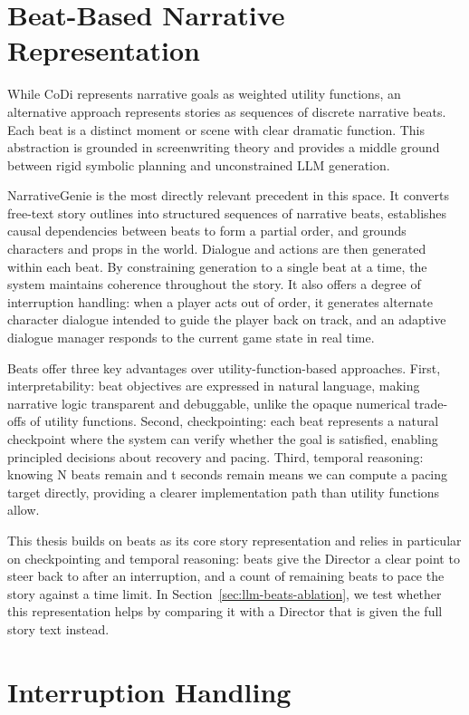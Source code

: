 \section{Beat-Based Narrative Representation}

While CoDi represents narrative goals as weighted utility functions, an alternative approach represents stories as sequences of discrete narrative beats. Each beat is a distinct moment or scene with clear dramatic function. This abstraction is grounded in screenwriting theory \cite{mckee1997story} and provides a middle ground between rigid symbolic planning and unconstrained LLM generation.

NarrativeGenie \cite{kumaran2024narrativegenie} is the most directly relevant precedent in this space. It converts free-text story outlines into structured sequences of narrative beats, establishes causal dependencies between beats to form a partial order, and grounds characters and props in the world. Dialogue and actions are then generated within each beat. By constraining generation to a single beat at a time, the system maintains coherence throughout the story. It also offers a degree of interruption handling: when a player acts out of order, it generates alternate character dialogue intended to guide the player back on track, and an adaptive dialogue manager responds to the current game state in real time.

Beats offer three key advantages over utility-function-based approaches. First, interpretability: beat objectives are expressed in natural language, making narrative logic transparent and debuggable, unlike the opaque numerical trade-offs of utility functions. Second, checkpointing: each beat represents a natural checkpoint where the system can verify whether the goal is satisfied, enabling principled decisions about recovery and pacing. Third, temporal reasoning: knowing N beats remain and t seconds remain means we can compute a pacing target directly, providing a clearer implementation path than utility functions allow.

This thesis builds on beats as its core story representation and relies in particular on checkpointing and temporal reasoning: beats give the Director a clear point to steer back to after an interruption, and a count of remaining beats to pace the story against a time limit. In Section~\ref{sec:llm-beats-ablation}, we test whether this representation helps by comparing it with a Director that is given the full story text instead.

\section{Interruption Handling }

